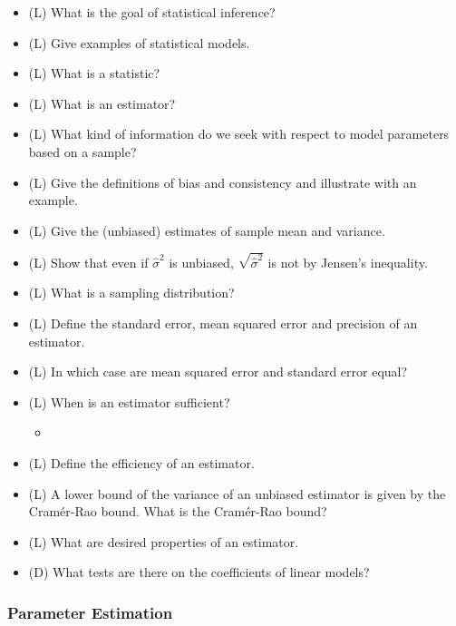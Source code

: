 \begin{itemize}
    \item (L) What is the goal of statistical inference?
    \answerboxM
    \item (L) Give examples of statistical models.
    \answerboxM
    \item (L) What is a statistic?
    \answerboxS
    \item (L) What is an estimator?
    \answerboxS
    \item (L) What kind of information do we seek with respect to model parameters based on a sample?
    \answerboxS
    \item (L) Give the definitions of bias and consistency and illustrate with an example.
    \answerboxM
    \item (L) Give the (unbiased) estimates of sample mean and variance.
    \answerboxM
    \item (L) Show that even if $\hat{\sigma}^2$ is unbiased, $\sqrt{\hat{\sigma}^2}$ is not by Jensen's inequality.
    \answerboxL
    \item (L) What is a sampling distribution?
    \answerboxM
    \item (L) Define the standard error, mean squared error and precision of an estimator.
    \answerboxM
    \item (L) In which case are mean squared error and standard error equal?
    \answerboxM
    \item (L) When is an estimator sufficient?
    \begin{itemize}
        \item {}
    \end{itemize}
    \answerboxM
    \item (L) Define the efficiency of an estimator.
    \answerboxM
    \item (L) A lower bound of the variance of an unbiased estimator is given by the Cramér-Rao bound. What is the Cramér-Rao bound?
    \answerboxM
    \item (L) What are desired properties of an estimator.
    \answerboxM
    \item (D) What tests are there on the coefficients of linear models?
    \answerboxL
\end{itemize}

\subsubsection*{Parameter Estimation}

